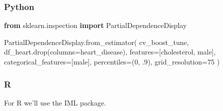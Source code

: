 \documentclass[
  letterpaper,
]{krantz}
\newenvironment{Shaded}{}{}
\newcommand{\AttributeTok}[1]{\textcolor[rgb]{0.49,0.56,0.16}{#1}}
\newcommand{\ConstantTok}[1]{\textcolor[rgb]{0.53,0.00,0.00}{#1}}
\newcommand{\DecValTok}[1]{\textcolor[rgb]{0.25,0.63,0.44}{#1}}
\newcommand{\FloatTok}[1]{\textcolor[rgb]{0.25,0.63,0.44}{#1}}
\newcommand{\FunctionTok}[1]{\textcolor[rgb]{0.02,0.16,0.49}{#1}}
\newcommand{\ImportTok}[1]{\textcolor[rgb]{0.00,0.50,0.00}{\textbf{#1}}}
\newcommand{\NormalTok}[1]{#1}
\newcommand{\OperatorTok}[1]{\textcolor[rgb]{0.40,0.40,0.40}{#1}}
\newcommand{\OtherTok}[1]{\textcolor[rgb]{0.00,0.44,0.13}{#1}}
\newcommand{\SpecialCharTok}[1]{\textcolor[rgb]{0.25,0.44,0.63}{#1}}
\newcommand{\StringTok}[1]{\textcolor[rgb]{0.25,0.44,0.63}{#1}}
\begin{document}
\subsubsection{Python}

\begin{Shaded}
\begin{Highlighting}[]
\ImportTok{from}\NormalTok{ sklearn.inspection }\ImportTok{import}\NormalTok{ PartialDependenceDisplay}

\NormalTok{PartialDependenceDisplay.from\_estimator(}
\NormalTok{    cv\_boost\_tune, }
\NormalTok{    df\_heart.drop(columns}\OperatorTok{=}\StringTok{\textquotesingle{}heart\_disease\textquotesingle{}}\NormalTok{), }
\NormalTok{    features}\OperatorTok{=}\NormalTok{[}\StringTok{\textquotesingle{}cholesterol\textquotesingle{}}\NormalTok{, }\StringTok{\textquotesingle{}male\textquotesingle{}}\NormalTok{], }
\NormalTok{    categorical\_features}\OperatorTok{=}\NormalTok{[}\StringTok{\textquotesingle{}male\textquotesingle{}}\NormalTok{], }
\NormalTok{    percentiles}\OperatorTok{=}\NormalTok{(}\DecValTok{0}\NormalTok{, }\FloatTok{.9}\NormalTok{),}
\NormalTok{    grid\_resolution}\OperatorTok{=}\DecValTok{75}
\NormalTok{)}
\end{Highlighting}
\end{Shaded}

\subsubsection{R}

For R we'll use the IML package.

\begin{Shaded}
\end{Shaded}
\end{document}
